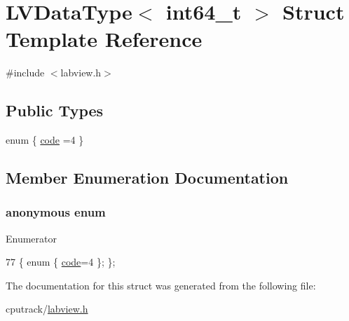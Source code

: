 \hypertarget{struct_l_v_data_type_3_01int64__t_01_4}{}\section{L\+V\+Data\+Type$<$ int64\+\_\+t $>$ Struct Template Reference}
\label{struct_l_v_data_type_3_01int64__t_01_4}


{\ttfamily \#include $<$labview.\+h$>$}

\subsection*{Public Types}
\begin{DoxyCompactItemize}
\item 
enum \{ \hyperlink{struct_l_v_data_type_3_01int64__t_01_4_a41123e1a1c64d241f96a422c09b66ac8a786bd307f592f9659d5cce778dc01b90}{code} =4
 \}
\end{DoxyCompactItemize}


\subsection{Member Enumeration Documentation}
\subsubsection[{\texorpdfstring{anonymous enum}{anonymous enum}}]{\setlength{\rightskip}{0pt plus 5cm}anonymous enum}\hypertarget{struct_l_v_data_type_3_01int64__t_01_4_a41123e1a1c64d241f96a422c09b66ac8}{}\label{struct_l_v_data_type_3_01int64__t_01_4_a41123e1a1c64d241f96a422c09b66ac8}
\begin{Desc}
\item[Enumerator]\par
\begin{description}
\item[{\em 
code\hypertarget{struct_l_v_data_type_3_01int64__t_01_4_a41123e1a1c64d241f96a422c09b66ac8a786bd307f592f9659d5cce778dc01b90}{}\label{struct_l_v_data_type_3_01int64__t_01_4_a41123e1a1c64d241f96a422c09b66ac8a786bd307f592f9659d5cce778dc01b90}
}]\end{description}
\end{Desc}

\begin{DoxyCode}
77 \{ \textcolor{keyword}{enum} \{ \hyperlink{struct_l_v_data_type_3_01int64__t_01_4_a41123e1a1c64d241f96a422c09b66ac8a786bd307f592f9659d5cce778dc01b90}{code}=4 \}; \};
\end{DoxyCode}


The documentation for this struct was generated from the following file\+:\begin{DoxyCompactItemize}
\item 
cputrack/\hyperlink{labview_8h}{labview.\+h}\end{DoxyCompactItemize}
